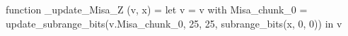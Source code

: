 function _update_Misa_Z (v, x) = let v = { v with Misa_chunk_0 = update_subrange_bits(v.Misa_chunk_0, 25, 25, subrange_bits(x, 0, 0)) } in
  v
